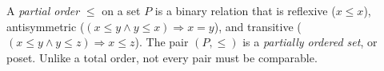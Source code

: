 
A \emph{partial order} $\le$ on a set $P$ is a binary relation that is reflexive ($x\le x$), antisymmetric ($(x\le y\land y\le x)\Rightarrow x=y$), and transitive ($(x\le y\land y\le z)\Rightarrow x\le z$). The pair $(P,\le)$ is a \emph{partially ordered set}, or poset. Unlike a total order, not every pair must be comparable.
